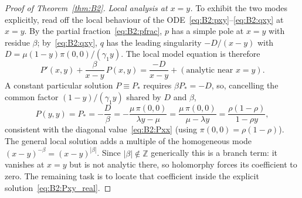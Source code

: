 \begin{proof}[Proof of Theorem~\ref{thm:B2}]
\smallskip\noindent\textit{Local analysis at $x=y$.}
To exhibit the two modes explicitly, read off the local behaviour of the
ODE~\eqref{eq:B2:pxy}--\eqref{eq:B2:qxy} at $x=y$. By the partial fraction~\eqref{eq:B2:pfrac},
$p$ has a simple pole at $x=y$ with residue $\beta$; by~\eqref{eq:B2:qxy}, $q$ has the leading
singularity $-D/(x-y)$ with $D=\mu(1-y)\pi(0,0)/(\gamma_1 y)$.  The local model equation is
therefore
\begin{equation}
    P'(x,y) + \frac{\beta}{x-y}\,P(x,y)
    = \frac{-D}{x-y} + (\text{analytic near }x=y).
    \label{eq:B2:local_ode}
\end{equation}
A constant particular solution $P\equiv P_*$ requires $\beta P_* = -D$, so, cancelling the
common factor $(1-y)/(\gamma_1 y)$ shared by $D$ and $\beta$,
\begin{equation}
    P(y,y) = P_* = -\frac{D}{\beta}
    = -\frac{\mu\,\pi(0,0)}{\lambda y-\mu}
    = \frac{\mu\,\pi(0,0)}{\mu-\lambda y}
    = \frac{\rho(1-\rho)}{1-\rho y},
    \label{eq:B2:regular_value}
\end{equation}
consistent with the diagonal value~\eqref{eq:B2:Pxx} (using $\pi(0,0)=\rho(1-\rho)$). The
general local solution adds a multiple of the homogeneous mode
$(x-y)^{-\beta}=(x-y)^{|\beta|}$. Since $|\beta|\notin\mathbb{Z}$ generically this is a
branch term: it vanishes at $x=y$ but is not analytic there, so holomorphy forces its
coefficient to zero. The remaining task is to locate that coefficient inside the explicit
solution~\eqref{eq:B2:Pxy_real}.


\end{proof}
